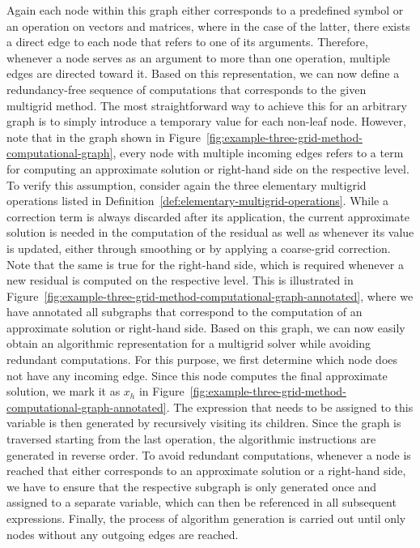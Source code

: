 Again each node within this graph either corresponds to a predefined symbol or an operation on vectors and matrices, where in the case of the latter, there exists a direct edge to each node that refers to one of its arguments.  
Therefore, whenever a node serves as an argument to more than one operation, multiple edges are directed toward it.
Based on this representation, we can now define a redundancy-free sequence of computations that corresponds to the given multigrid method.
The most straightforward way to achieve this for an arbitrary graph is to simply introduce a temporary value for each non-leaf node.
However, note that in the graph shown in Figure~\ref{fig:example-three-grid-method-computational-graph}, every node with multiple incoming edges refers to a term for computing an approximate solution or right-hand side on the respective level.
To verify this assumption, consider again the three elementary multigrid operations listed in Definition~\ref{def:elementary-multigrid-operations}.
While a correction term is always discarded after its application, the current approximate solution is needed in the computation of the residual as well as whenever its value is updated, either through smoothing or by applying a coarse-grid correction.
Note that the same is true for the right-hand side, which is required whenever a new residual is computed on the respective level.
This is illustrated in Figure~\ref{fig:example-three-grid-method-computational-graph-annotated}, where we have annotated all subgraphs that correspond to the computation of an approximate solution or right-hand side.
Based on this graph, we can now easily obtain an algorithmic representation for a multigrid solver while avoiding redundant computations.
For this purpose, we first determine which node does not have any incoming edge.
Since this node computes the final approximate solution, we mark it as $x_h$ in Figure~\ref{fig:example-three-grid-method-computational-graph-annotated}.
The expression that needs to be assigned to this variable is then generated by recursively visiting its children.
Since the graph is traversed starting from the last operation, the algorithmic instructions are generated in reverse order. 
To avoid redundant computations, whenever a node is reached that either corresponds to an approximate solution or a right-hand side, we have to ensure that the respective subgraph is only generated once and assigned to a separate variable, which can then be referenced in all subsequent expressions.
Finally, the process of algorithm generation is carried out until only nodes without any outgoing edges are reached.
